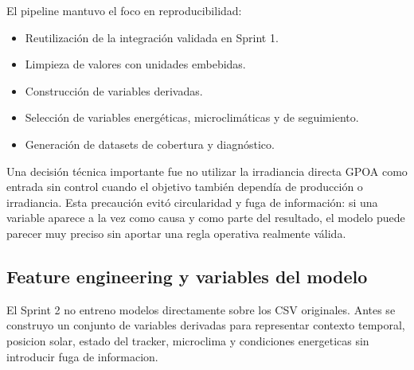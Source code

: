 ﻿\documentclass[11pt,a4paper]{article}
\begin{document}
El pipeline mantuvo el foco en reproducibilidad:

\begin{itemize}
    \item Reutilización de la integración validada en Sprint 1.
    \item Limpieza de valores con unidades embebidas.
    \item Construcción de variables derivadas.
    \item Selección de variables energéticas, microclimáticas y de seguimiento.
    \item Generación de datasets de cobertura y diagnóstico.
\end{itemize}

Una decisión técnica importante fue no utilizar la irradiancia directa GPOA como entrada sin control cuando el objetivo también dependía de producción o irradiancia. Esta precaución evitó circularidad y fuga de información: si una variable aparece a la vez como causa y como parte del resultado, el modelo puede parecer muy preciso sin aportar una regla operativa realmente válida.

\subsection{Feature engineering y variables del modelo}

El Sprint 2 no entreno modelos directamente sobre los CSV originales. Antes se construyo un conjunto de variables derivadas para representar contexto temporal, posicion solar, estado del tracker, microclima y condiciones energeticas sin introducir fuga de informacion.
\end{document}
